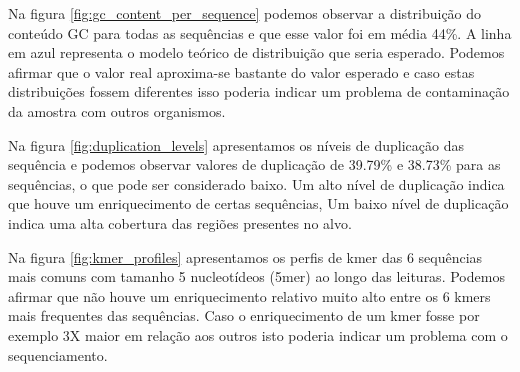 {\begin{landscape}
\end{landscape}

}

Na figura \ref{fig:gc_content_per_sequence} podemos observar a distribuição do conteúdo GC para todas as sequências e que esse valor foi em média 44\%. A linha em azul representa o modelo teórico de distribuição que seria esperado. Podemos afirmar que o valor real aproxima-se bastante do valor esperado e caso estas distribuições fossem diferentes isso poderia indicar um problema de contaminação da amostra com outros organismos.

Na figura \ref{fig:duplication_levels} apresentamos os níveis de duplicação das sequência e podemos observar valores de duplicação de 39.79\% e 38.73\% para as sequências, o que pode ser considerado baixo. Um alto nível de duplicação indica que houve um enriquecimento de certas sequências, Um baixo nível de duplicação indica uma alta cobertura das regiões presentes no alvo.

Na figura \ref{fig:kmer_profiles} apresentamos os perfis de kmer das 6 sequências mais comuns com tamanho 5 nucleotídeos (5mer) ao longo das leituras. Podemos afirmar que não houve um enriquecimento relativo muito alto entre os 6 kmers mais frequentes das sequências. Caso o enriquecimento de um kmer fosse por exemplo 3X maior em relação aos outros isto poderia indicar um problema com o sequenciamento.


